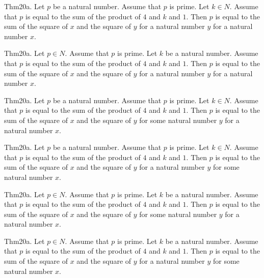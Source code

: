 \documentclass{article}
\begin{document}
Thm20a. Let $p$ be a natural number. Assume that $p$ is prime. Let $k \in N$. Assume that $p$ is equal to the sum of the product of $4$ and $k$ and $1$. Then $p$ is equal to the sum of the square of $x$ and the square of $y$ for a natural number $y$ for a natural number $x$.

Thm20a. Let $p \in N$. Assume that $p$ is prime. Let $k$ be a natural number. Assume that $p$ is equal to the sum of the product of $4$ and $k$ and $1$. Then $p$ is equal to the sum of the square of $x$ and the square of $y$ for a natural number $y$ for a natural number $x$.

Thm20a. Let $p$ be a natural number. Assume that $p$ is prime. Let $k \in N$. Assume that $p$ is equal to the sum of the product of $4$ and $k$ and $1$. Then $p$ is equal to the sum of the square of $x$ and the square of $y$ for some natural number $y$ for a natural number $x$.

Thm20a. Let $p$ be a natural number. Assume that $p$ is prime. Let $k \in N$. Assume that $p$ is equal to the sum of the product of $4$ and $k$ and $1$. Then $p$ is equal to the sum of the square of $x$ and the square of $y$ for a natural number $y$ for some natural number $x$.

Thm20a. Let $p \in N$. Assume that $p$ is prime. Let $k$ be a natural number. Assume that $p$ is equal to the sum of the product of $4$ and $k$ and $1$. Then $p$ is equal to the sum of the square of $x$ and the square of $y$ for some natural number $y$ for a natural number $x$.

Thm20a. Let $p \in N$. Assume that $p$ is prime. Let $k$ be a natural number. Assume that $p$ is equal to the sum of the product of $4$ and $k$ and $1$. Then $p$ is equal to the sum of the square of $x$ and the square of $y$ for a natural number $y$ for some natural number $x$.
\end{document}
